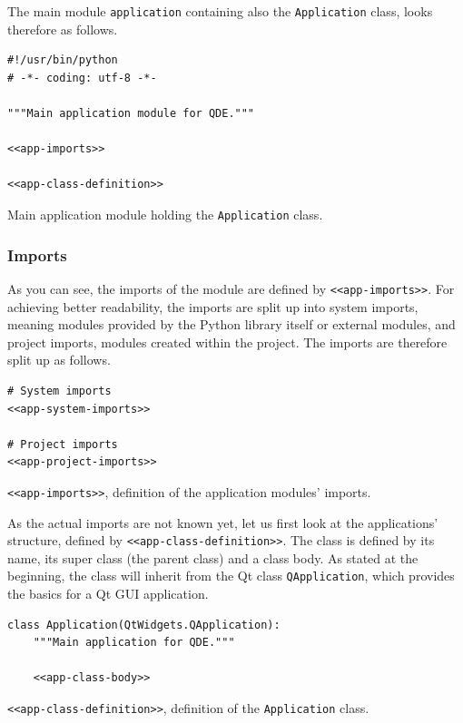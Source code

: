 \documentclass[10pt, openright, notitlepage]{scrreprt}
\begin{document}
The main module \texttt{application} containing also the \texttt{Application} class, looks
therefore as follows.

\begin{listing}[H]
\begin{verbatim}
#!/usr/bin/python
# -*- coding: utf-8 -*-

"""Main application module for QDE."""

<<app-imports>>

<<app-class-definition>>
\end{verbatim}
\caption{Main application module holding the \texttt{Application} class.}
\end{listing}

\subsubsection{Imports}
\label{sec:org5459be3}
As you can see, the imports of the module are defined by \texttt{<<app-imports>>}. For
achieving better readability, the imports are split up into system imports,
meaning modules provided by the Python library itself or external modules, and
project imports, modules created within the project. The imports are therefore
split up as follows.

\begin{listing}[H]
\begin{verbatim}
# System imports
<<app-system-imports>>

# Project imports
<<app-project-imports>>
\end{verbatim}
\caption{\label{app-imports}
\texttt{<<app-imports>>}, definition of the application modules' imports.}
\end{listing}

As the actual imports are not known yet, let us first look at the applications'
structure, defined by \texttt{<<app-class-definition>>}. The class is defined by its
name, its super class (the parent class) and a class body. As stated at the
beginning, the class will inherit from the Qt class \texttt{QApplication}, which
provides the basics for a Qt GUI application.

\begin{listing}[H]
\begin{verbatim}
class Application(QtWidgets.QApplication):
    """Main application for QDE."""

    <<app-class-body>>
\end{verbatim}
\caption{\label{app-class-definition}
\texttt{<<app-class-definition>>}, definition of the \texttt{Application} class.}
\end{listing}
\end{document}
